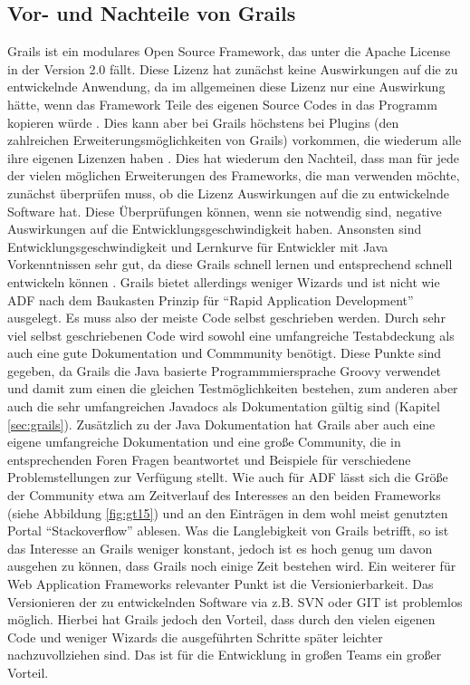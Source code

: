 \subsection{Vor- und Nachteile von Grails}
\label{sec:grails-vor-nach}
Grails ist ein modulares Open Source Framework, das unter die Apache License in der Version 2.0 fällt. Diese Lizenz hat zunächst keine Auswirkungen auf die zu entwickelnde Anwendung, da im allgemeinen diese Lizenz nur eine Auswirkung hätte, wenn das Framework Teile des eigenen Source Codes in das Programm kopieren würde \autocite{AL2015}. Dies kann aber bei Grails höchstens bei Plugins (den zahlreichen Erweiterungsmöglichkeiten von Grails) vorkommen, die wiederum alle ihre eigenen Lizenzen haben \autocite{GPO2015}. Dies hat wiederum den Nachteil, dass man für jede der vielen möglichen Erweiterungen des Frameworks, die man verwenden möchte, zunächst überprüfen muss, ob die Lizenz Auswirkungen auf die zu entwickelnde Software hat. Diese Überprüfungen können, wenn sie notwendig sind, negative Auswirkungen auf die Entwicklungsgeschwindigkeit haben. Ansonsten sind Entwicklungsgeschwindigkeit und Lernkurve für Entwickler mit Java Vorkenntnissen sehr gut, da diese Grails schnell lernen und entsprechend schnell entwickeln können \autocite[S.24]{AUW2009}. Grails bietet allerdings weniger Wizards und ist nicht wie ADF nach dem Baukasten Prinzip für "`Rapid Application Development"' ausgelegt. Es muss also der meiste Code selbst geschrieben werden. Durch sehr viel selbst geschriebenen Code wird sowohl eine umfangreiche Testabdeckung als auch eine gute Dokumentation und Commmunity benötigt. Diese Punkte sind gegeben, da Grails die Java basierte Programmmiersprache Groovy verwendet und damit zum einen die gleichen Testmöglichkeiten bestehen, zum anderen aber auch die sehr umfangreichen Javadocs als Dokumentation gültig sind (Kapitel \ref{sec:grails}). Zusätzlich zu der Java Dokumentation hat Grails aber auch eine eigene umfangreiche Dokumentation und eine große Community, die in entsprechenden Foren Fragen beantwortet und Beispiele für verschiedene Problemstellungen zur Verfügung stellt. Wie auch für ADF lässt sich die Größe der Community etwa am Zeitverlauf des Interesses an den beiden Frameworks (siehe Abbildung \ref{fig:gt15}) und an den Einträgen in dem wohl meist genutzten Portal "`Stackoverflow"'\autocite{SOFG2015} ablesen. Was die Langlebigkeit von Grails betrifft, so ist das Interesse an Grails weniger konstant, jedoch ist es hoch genug um davon ausgehen zu können, dass Grails noch einige Zeit bestehen wird. Ein weiterer für Web Application Frameworks relevanter Punkt ist die Versionierbarkeit. Das Versionieren der zu entwickelnden Software via z.B. SVN oder GIT ist problemlos möglich. Hierbei hat Grails jedoch den Vorteil, dass durch den vielen eigenen Code und weniger Wizards die ausgeführten Schritte später leichter nachzuvollziehen sind. Das ist für die Entwicklung in großen Teams ein großer Vorteil.

